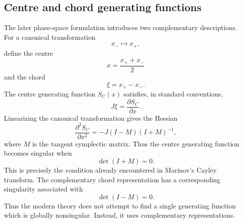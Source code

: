 \subsection{Centre and chord generating functions}
The later phase-space formulation introduces two complementary descriptions.
For a canonical transformation
\begin{equation}
 x_-\mapsto x_+,
\end{equation}
define the centre
\begin{equation}
 x=\frac{x_++x_-}{2}
\end{equation}
and the chord
\begin{equation}
 \xi=x_+-x_-.
\end{equation}
The centre generating function \(S_C(x)\) satisfies, in standard conventions,
\begin{equation}
 J\xi=\frac{\partial S_C}{\partial x}.
 \label{centregradient}
\end{equation}
Linearizing the canonical transformation gives the Hessian
\begin{equation}
 \frac{\partial^2 S_C}{\partial x^2}
 =
 -J(I-M)(I+M)^{-1},
 \label{centreHessian}
\end{equation}
where \(M\) is the tangent symplectic matrix.  Thus the centre generating
function becomes singular when
\begin{equation}
 \det(I+M)=0.
\end{equation}
This is precisely the condition already encountered in Marinov's Cayley
transform. \cite{OzorioBrodier2006}
The complementary chord representation has a corresponding singularity
associated with
\begin{equation}
 \det(I-M)=0.
\end{equation}
Thus the modern theory does not attempt to find a single generating function
which is globally nonsingular.  Instead, it uses complementary
representations.

